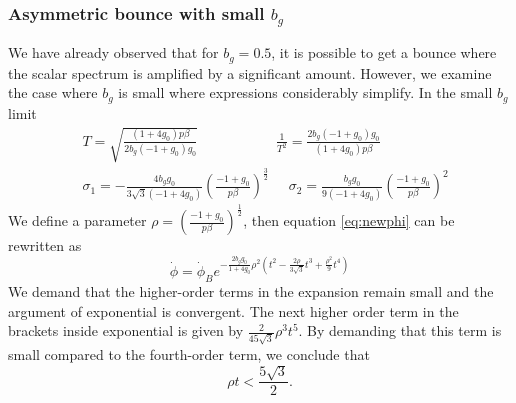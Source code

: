 \documentclass[12pt,a4paper]{article}
\numberwithin{equation}{section}
\numberwithin{equation}{section}
\begin{document}
\subsubsection{Asymmetric bounce with small \texorpdfstring{$b_g$}{bg}}
We have already observed that for $b_g=0.5$, it is possible to get a bounce where the scalar spectrum is amplified by a significant amount. However, we examine the case where $b_g$ is small where expressions considerably simplify. %
In the small $b_g$ limit
\begin{equation}
    \begin{split}
        & T = \sqrt{\frac{(1+4g_0)p \beta}{2b_g(-1+g_0)g_0}}  \;\;\;\;\;\;\;\;\;\;\;\;\;\;\;\;\;\;\;\;  \frac{1}{T^2}= \frac{2b_g(-1+g_0)g_0}{(1+4g_0)p \beta} \\
       & \sigma_1 = -\frac{4b_gg_0}{3\sqrt{3}(-1+4g_0)} \left(\frac{-1+g_0}{p\beta}\right)^{\frac{3}{2}} \;\;\;\;\; \sigma_2 = \frac{b_gg_0}{9(-1+4g_0)} \left(\frac{-1+g_0}{p\beta}\right)^{2}
    \end{split}
\end{equation}
We define a parameter $\rho=\left(\frac{-1+g_0}{p\beta}\right)^{\frac{1}{2}}$, then equation \eqref{eq:newphi} can be rewritten as
\begin{equation}
    \dot{\phi} = \dot{\phi}_B e^{-\frac{2b_g g_0}{1+4g_0} \rho^2 \left(t^2 -\frac{2\rho}{3\sqrt{3}} t^3+   \frac{\rho^2}{9} t^4 \right)}
\end{equation}
We demand that the higher-order terms in the expansion remain small and the argument of exponential is convergent. The next higher order term in the brackets inside exponential is given by $\frac{2}{45\sqrt{3}} \rho^3 t^5$. By demanding that this term is small compared to the fourth-order term, we conclude that 
\begin{equation}
    \rho t < \frac{5\sqrt{3}}{2}.
\end{equation}
\end{document}
